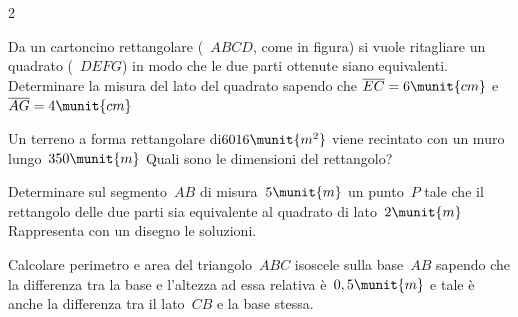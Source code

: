\begin{htmulticols}{2}

\begin{esercizio}[*]
\label{ese:3.135}
Da un cartoncino rettangolare (~\(ABCD\), come in figura) si vuole 
ritagliare un quadrato (~\(DEFG\)) in modo che le due parti ottenute siano 
equivalenti.
Determinare la misura del lato del quadrato sapendo che
\(\overline {EC} = 6\munit{cm}\) e\(\overline {AG} = 4\munit{cm}\)
\immagine{}{\rettb}
%  
\end{esercizio}

\begin{esercizio}[*]
\label{ese:3.136}
Un terreno a forma rettangolare di\(6016\munit{m^2}\) viene recintato con un 
muro 
lungo~\(350\munit{m}\) Quali sono le dimensioni del rettangolo?
\end{esercizio}

\begin{esercizio}[*]
\label{ese:3.137}
Determinare sul segmento~\(AB\) di misura~\(5\munit{m}\) un punto~\(P\) tale 
che 
il rettangolo delle due parti sia equivalente al quadrato di 
lato~\(2\munit{m}\) Rappresenta con un disegno le soluzioni.
\end{esercizio}

\begin{esercizio}
\label{ese:3.138}
Calcolare perimetro e area del triangolo~\(ABC\) isoscele sulla 
base~\(AB\) sapendo che la differenza tra la base e l'altezza ad essa 
relativa è~\(0,5\munit{m}\) e tale è anche la differenza tra il 
lato~\(CB\) e la base stessa.
\end{esercizio}


\end{htmulticols}
